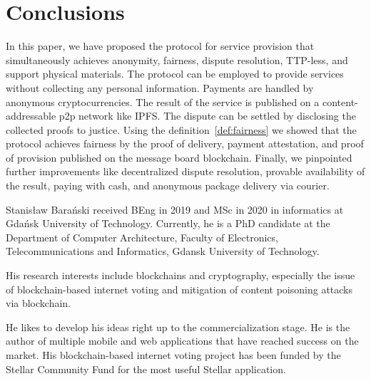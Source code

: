 \documentclass{ieeeaccess}
\begin{document}
\section{Conclusions}\label{sec:conclusion}
In this paper, we have proposed the protocol for service provision that simultaneously achieves anonymity, fairness, dispute resolution, TTP-less, and support physical materials. The protocol can be employed to provide services without collecting any personal information. Payments are handled by anonymous cryptocurrencies. The result of the service is published on a content-addressable p2p network like IPFS. The dispute can be settled by disclosing the collected proofs to justice. 
Using the definition~\ref{def:fairness} we showed that the protocol achieves fairness by the proof of delivery, payment attestation, and proof of provision published on the message board blockchain. Finally, we pinpointed further improvements like decentralized dispute resolution, provable availability of the result, paying with cash, and anonymous package delivery via courier.



\EOD


\begin{IEEEbiography}{Stanis\l{}aw Bara{\'n}ski} received BEng in 2019 and MSc in 2020 in informatics at Gdańsk University of Technology. 
Currently, he is a PhD candidate at the Department of Computer Architecture, Faculty of Electronics, Telecommunications and Informatics, Gdansk University of Technology.

His research interests include blockchains and cryptography, especially the issue of blockchain-based internet voting and mitigation of content poisoning attacks via blockchain.

He likes to develop his ideas right up to the commercialization stage. He is the author of multiple mobile and web applications that have reached success on the market. His blockchain-based internet voting project has been funded by the Stellar Community Fund for the most useful Stellar application. 
\end{IEEEbiography}
\end{document}
